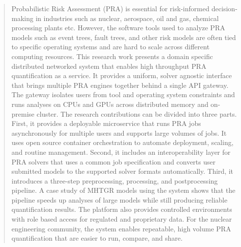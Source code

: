 \begin{abstract}
Probabilistic Risk Assessment (PRA) is essential for risk-informed decision-making in industries such as nuclear, aerospace, oil and gas, chemical processing plants etc. However, the software tools used to analyze PRA models such as event trees, fault trees, and other risk models are often tied to specific operating systems and are hard to scale across different computing resources. This research work presents a domain specific distributed networked system that enables high throughput PRA quantification as a service. It provides a uniform, solver agnostic interface that brings multiple PRA engines together behind a single API gateway. The gateway isolates users from tool and operating system constraints and runs analyses on CPUs and GPUs across distributed memory and on-premise cluster. The research contributions can be divided into three parts. First, it provides a deployable microservice that runs PRA jobs asynchronously for multiple users and supports large volumes of jobs. It uses open source container orchestration to automate deployment, scaling, and routine management. Second, it includes an interoperability layer for PRA solvers that uses a common job specification and converts user submitted models to the supported solver formats automatically. Third, it introduces a three-step preprocessing, processing, and postprocessing pipeline. A case study of MHTGR models using the system shows that the pipeline speeds up analyses of large models while still producing reliable quantification results. The platform also provides controlled environments with role based access for regulated and proprietary data. For the nuclear engineering community, the system enables repeatable, high volume PRA quantification that are easier to run, compare, and share. 
\end{abstract}

\thesistableofcontents
\thesislistoftables
\thesislistoffigures
